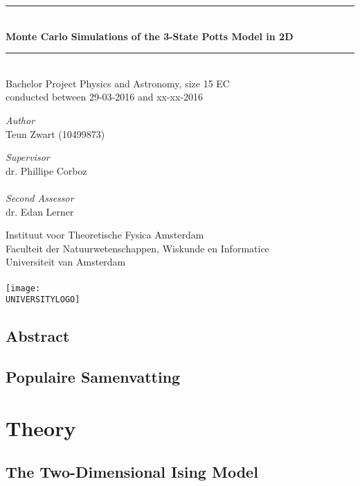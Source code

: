 \documentclass[11pt, a4paper]{report} %
\newcommand\TITLE{Monte Carlo Simulations of the 3-State Potts Model in 2D}
\newcommand\THESISFORM{Bachelor Project Physics and Astronomy, size 15 EC\\conducted between 29-03-2016 and xx-xx-2016}
\newcommand\INSTITUTE{Instituut voor Theoretische Fysica Amsterdam}
\newcommand\FACULTY{Faculteit der Natuurwetenschappen, Wiskunde en Informatice}
\newcommand\UNIVERSITY{Universiteit van Amsterdam}
\newcommand\AUTHOR{Teun Zwart (10499873)}
\newcommand\SUPERVISOR{dr. Phillipe Corboz}
\newcommand\SECONDASSESSOR{dr. Edan Lerner}
\newcommand\UNIVERSITYLOGO{UvA-logo.png} %
\begin{document}
\begin{titlepage}
	\begin{center}
		\rule{\textwidth}{0.4mm}\\[0.5cm]
		\huge{\textbf{\TITLE}}
		\rule{\textwidth}{0.4mm}\\[0.5cm]
		\large{\THESISFORM}\\[0.5cm]
		\begin{minipage}[t]{0.4\textwidth}
			\begin{flushleft}
				\large\emph{Author}\\{\AUTHOR}
			\end{flushleft}
		\end{minipage}
		\begin{minipage}[t]{0.4\textwidth}
			\begin{flushright}
				\large\emph{Supervisor}\\{\SUPERVISOR}\\~\\
				\large\emph{Second Assessor}\\{\SECONDASSESSOR}
			\end{flushright}
		\end{minipage}
		\vfill
		\large{\INSTITUTE}\\
		\large{\FACULTY}\\
		\large{\UNIVERSITY}\\~\\
		\texttt{[image: \\UNIVERSITYLOGO]}
	\end{center}
\end{titlepage}

\thispagestyle{plain}
\section*{Abstract}


\newpage
\thispagestyle{plain}
\section*{Populaire Samenvatting}


\tableofcontents


\chapter{Theory}

\section{The Two-Dimensional Ising Model}
\end{document}
